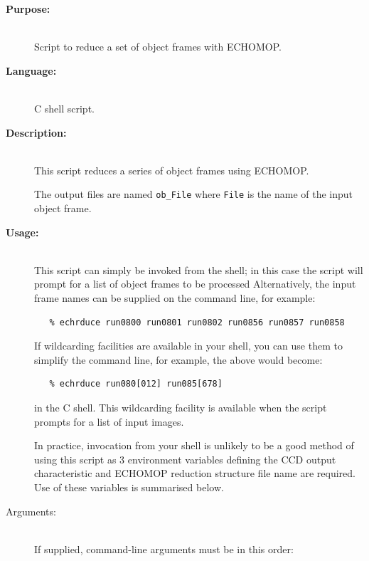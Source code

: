 \documentclass[twoside,11pt]{article}
\newcommand{\xref}[3]{#1}
\renewcommand{\_}{\texttt{\symbol{95}}}
\begin{document}
\begin{description}

\item [{\bf Purpose:}] \mbox{} \\
     Script to reduce a set of object frames with \xref{ECHOMOP}{sun152}{}.

\item [{\bf Language:}] \mbox{} \\
     C shell script.

\item [{\bf Description:}] \mbox{} \\
     This script reduces a series of object frames using ECHOMOP.

     The output files are named \verb+ob_File+ where \verb+File+ is the
     name of the input object frame.

\item [{\bf Usage:}] \mbox{} \\
     This script can simply be invoked from the shell; in this case
     the script will prompt for a list of object frames to be processed
     Alternatively, the input frame names can be supplied on the
     command line, for example:

\begin{verbatim}
   % echrduce run0800 run0801 run0802 run0856 run0857 run0858
\end{verbatim}

     If wildcarding facilities are available in your shell, you can use
     them to simplify the command line, for example, the above would
     become:

\begin{verbatim}
   % echrduce run080[012] run085[678]
\end{verbatim}

     in the C shell.  This wildcarding facility is available when the
     script prompts for a list of input images.

     In practice, invocation from your shell is unlikely to be a good
     method of using this script as 3 environment variables defining
     the CCD output characteristic and ECHOMOP reduction structure file
     name are required.  Use of these variables is summarised below.

\item [Arguments:] \mbox{} \\
     If supplied, command-line arguments must be in this order:

\begin{enumerate}


\end{enumerate}
\end{description}
\end{document}

